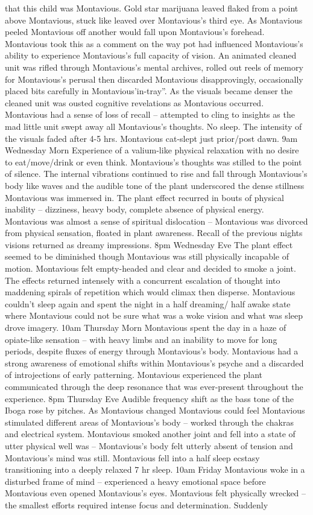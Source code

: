 \documentclass[12pt]{book}
\begin{document}
that this child was Montavious. Gold star marijuana leaved flaked from a point above Montavious, stuck like leaved over Montavious's third eye. As Montavious peeled Montavious off another would fall upon Montavious's forehead. Montavious took this as a comment on the way pot had influenced Montavious's ability to experience Montavious's full capacity of vision. An animated cleaned unit was rifled through Montavious's mental archives, rolled out reels of memory for Montavious's perusal then discarded Montavious disapprovingly, occasionally placed bits carefully in Montavious'in-tray''. As the visuals became denser the cleaned unit was ousted cognitive revelations as Montavious occurred. Montavious had a sense of loss of recall -- attempted to cling to insights as the mad little unit swept away all Montavious's thoughts. No sleep. The intensity of the visuals faded after 4-5 hrs. Montavious cat-slept just prior/post dawn. 9am Wednesday Morn Experience of a valium-like physical relaxation with no desire to eat/move/drink or even think. Montavious's thoughts was stilled to the point of silence. The internal vibrations continued to rise and fall through Montavious's body like waves and the audible tone of the plant underscored the dense stillness Montavious was immersed in. The plant effect recurred in bouts of physical inability -- dizziness, heavy body, complete absence of physical energy. Montavious was almost a sense of spiritual dislocation -- Montavious was divorced from physical sensation, floated in plant awareness. Recall of the previous nights visions returned as dreamy impressions. 8pm Wednesday Eve The plant effect seemed to be diminished though Montavious was still physically incapable of motion. Montavious felt empty-headed and clear and decided to smoke a joint. The effects returned intensely with a concurrent escalation of thought into maddening spirals of repetition which would climax then disperse. Montavious couldn't sleep again and spent the night in a half dreaming/ half awake state where Montavious could not be sure what was a woke vision and what was sleep drove imagery. 10am Thursday Morn Montavious spent the day in a haze of opiate-like sensation -- with heavy limbs and an inability to move for long periods, despite fluxes of energy through Montavious's body. Montavious had a strong awareness of emotional shifts within Montavious's psyche and a discarded of introjections of early patterning. Montavious experienced the plant communicated through the deep resonance that was ever-present throughout the experience. 8pm Thursday Eve Audible frequency shift as the bass tone of the Iboga rose by pitches. As Montavious changed Montavious could feel Montavious stimulated different areas of Montavious's body -- worked through the chakras and electrical system. Montavious smoked another joint and fell into a state of utter physical well was -- Montavious's body felt utterly absent of tension and Montavious's mind was still. Montavious fell into a half sleep ecstasy transitioning into a deeply relaxed 7 hr sleep. 10am Friday Montavious woke in a disturbed frame of mind -- experienced a heavy emotional space before Montavious even opened Montavious's eyes. Montavious felt physically wrecked -- the smallest efforts required intense focus and determination. Suddenly 
\end{document}
